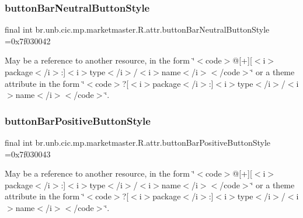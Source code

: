 \subsubsection{\texorpdfstring{button\+Bar\+Neutral\+Button\+Style}{buttonBarNeutralButtonStyle}}
{\footnotesize\ttfamily final int br.\+unb.\+cic.\+mp.\+marketmaster.\+R.\+attr.\+button\+Bar\+Neutral\+Button\+Style =0x7f030042\hspace{0.3cm}{\ttfamily [static]}}

May be a reference to another resource, in the form \char`\"{}$<$code$>$@\mbox{[}+\mbox{]}\mbox{[}$<$i$>$package$<$/i$>$\+:\mbox{]}$<$i$>$type$<$/i$>$/$<$i$>$name$<$/i$>$$<$/code$>$\char`\"{} or a theme attribute in the form \char`\"{}$<$code$>$?\mbox{[}$<$i$>$package$<$/i$>$\+:\mbox{]}$<$i$>$type$<$/i$>$/$<$i$>$name$<$/i$>$$<$/code$>$\char`\"{}. \mbox{\label{classbr_1_1unb_1_1cic_1_1mp_1_1marketmaster_1_1R_1_1attr_a2402d49ff5a124692627245a8d764400}} 
\subsubsection{\texorpdfstring{button\+Bar\+Positive\+Button\+Style}{buttonBarPositiveButtonStyle}}
{\footnotesize\ttfamily final int br.\+unb.\+cic.\+mp.\+marketmaster.\+R.\+attr.\+button\+Bar\+Positive\+Button\+Style =0x7f030043\hspace{0.3cm}{\ttfamily [static]}}

May be a reference to another resource, in the form \char`\"{}$<$code$>$@\mbox{[}+\mbox{]}\mbox{[}$<$i$>$package$<$/i$>$\+:\mbox{]}$<$i$>$type$<$/i$>$/$<$i$>$name$<$/i$>$$<$/code$>$\char`\"{} or a theme attribute in the form \char`\"{}$<$code$>$?\mbox{[}$<$i$>$package$<$/i$>$\+:\mbox{]}$<$i$>$type$<$/i$>$/$<$i$>$name$<$/i$>$$<$/code$>$\char`\"{}. \mbox{\label{classbr_1_1unb_1_1cic_1_1mp_1_1marketmaster_1_1R_1_1attr_a23e21de3eeab8c0a6c048f8f3b3f0d9f}} 
